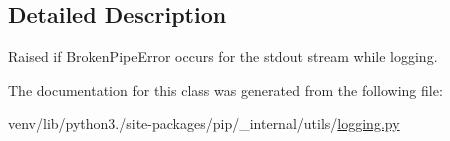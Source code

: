 \subsection{Detailed Description}
\begin{DoxyVerb}Raised if BrokenPipeError occurs for the stdout stream while logging.
\end{DoxyVerb}
 

The documentation for this class was generated from the following file\+:\begin{DoxyCompactItemize}
\item 
venv/lib/python3./site-\/packages/pip/\+\_\+internal/utils/\hyperlink{logging_8py}{logging.\+py}\end{DoxyCompactItemize}

